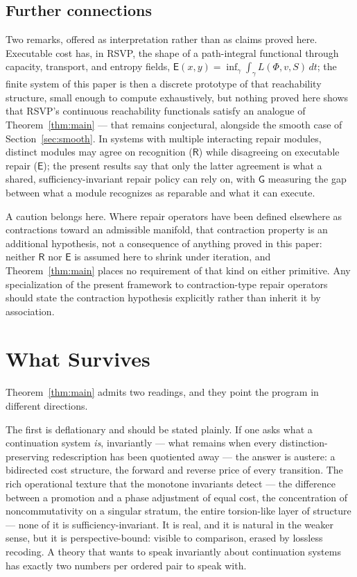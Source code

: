 \documentclass[11pt]{article}
\theoremstyle{remark}
\newcommand{\R}{\mathsf{R}}
\newcommand{\E}{\mathsf{E}}
\newcommand{\G}{\mathsf{G}}
\begin{document}
\subsection{Further connections}\label{subsec:further}

Two remarks, offered as interpretation rather than as claims proved
here. Executable cost has, in RSVP, the shape of a path-integral
functional through capacity, transport, and entropy fields,
$\E(x,y)=\inf_\gamma\int_\gamma L(\Phi,v,S)\,dt$; the finite system of
this paper is then a discrete prototype of that reachability
structure, small enough to compute exhaustively, but nothing proved
here shows that RSVP's continuous reachability functionals satisfy an
analogue of Theorem~\ref{thm:main} --- that remains conjectural,
alongside the smooth case of Section~\ref{sec:smooth}. In systems with
multiple interacting repair modules, distinct modules may agree on
recognition ($\R$) while disagreeing on executable repair ($\E$); the
present results say that only the latter agreement is what a shared,
sufficiency-invariant repair policy can rely on, with $\G$ measuring
the gap between what a module recognizes as reparable and what it can
execute.

A caution belongs here. Where repair operators have been defined
elsewhere as contractions toward an admissible manifold, that
contraction property is an additional hypothesis, not a consequence
of anything proved in this paper: neither $\R$ nor $\E$ is assumed
here to shrink under iteration, and Theorem~\ref{thm:main} places no
requirement of that kind on either primitive. Any specialization of
the present framework to contraction-type repair operators should
state the contraction hypothesis explicitly rather than inherit it by
association.

\section{What Survives}

Theorem~\ref{thm:main} admits two readings, and they point the
program in different directions.

The first is deflationary and should be stated plainly. If one asks
what a continuation system \emph{is}, invariantly --- what remains
when every distinction-preserving redescription has been quotiented
away --- the answer is austere: a bidirected cost structure, the
forward and reverse price of every transition. The rich operational
texture that the monotone invariants detect --- the difference
between a promotion and a phase adjustment of equal cost, the
concentration of noncommutativity on a singular stratum, the entire
torsion-like layer of structure --- none of it is
sufficiency-invariant. It is real, and it is natural in the weaker
sense, but it is perspective-bound: visible to comparison, erased by
lossless recoding. A theory that wants to speak invariantly about
continuation systems has exactly two numbers per ordered pair to
speak with.
\end{document}
